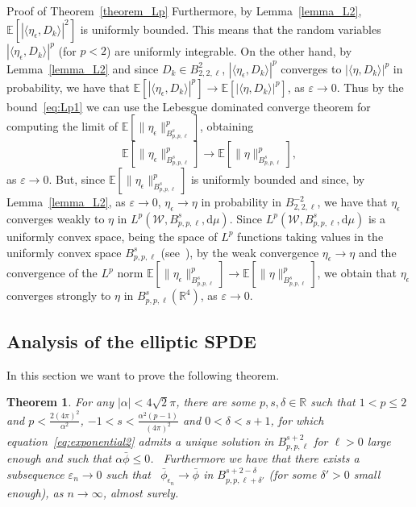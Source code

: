 \documentclass[a4paper,10pt]{article}
\newcommand{\mathd}{\mathrm{d}}
\newenvironment{proof*}[1]{\noindent\textbf{#1\ }}{\hspace*{\fill}$\Box$\medskip}
\newtheorem{theorem}{Theorem}
\begin{document}
\begin{proof*}{Proof of Theorem~\ref{theorem_Lp}}
  Furthermore, by Lemma~\ref{lemma_L2}, $\mathbb{E} [| \langle
  \eta_{\epsilon}, D_k \rangle |^2]$ is uniformly bounded. This means that the
  random variables $| \langle \eta_{\epsilon}, D_k \rangle |^p$ (for $p < 2$)
  are uniformly integrable. On the other hand, by Lemma~\ref{lemma_L2} and
  since $D_k \in B^2_{2, 2, \ell}$, $| \langle \eta_{\epsilon}, D_k \rangle
  |^p$ converges to $| \langle \eta, D_k \rangle |^p$ in probability, we have
  that $\mathbb{E} [| \langle \eta_{\epsilon}, D_k \rangle |^p] \rightarrow
  \mathbb{E} [| \langle \eta, D_k \rangle |^p]$, as $\varepsilon \rightarrow
  0$. Thus by the bound~{\eqref{eq:Lp1}} we can use the Lebesgue dominated
  converge theorem for computing the limit of $\mathbb{E} [\| \eta_{\epsilon}
  \|_{B^s_{p, p, \ell}}^p]$, obtaining
  \[ \mathbb{E} [\| \eta_{\epsilon} \|_{B^s_{p, p, \ell}}^p] \rightarrow
     \mathbb{E} [\| \eta \|_{B^s_{p, p, \ell}}^p], \]
  as $\varepsilon \rightarrow 0$. But, since $\mathbb{E} [\| \eta_{\epsilon}
  \|_{B^s_{p, p, \ell}}^p]$ is uniformly bounded and since, by
  Lemma~\ref{lemma_L2}, as $\varepsilon \rightarrow 0$, $\eta_{\epsilon}
  \rightarrow \eta$ in probability in $B^{- 2}_{2, 2, \ell}$, we have that
  $\eta_{\epsilon}$ converges weakly to $\eta$ in $L^p (\mathcal{W}, B^s_{p,
  p, \ell}, \mathd \mu)$. Since $L^p (\mathcal{W}, B^s_{p, p, \ell}, \mathd
  \mu)$ is a uniformly convex space, being the space of $L^p$ functions taking
  values in the uniformly convex space $B^s_{p, p, \ell}$
  (see~{\cite{Boyko2009}}), by the weak convergence $\eta_{\epsilon}
  \rightarrow \eta$ and the convergence of the $L^p$ norm $\mathbb{E} [\|
  \eta_{\epsilon} \|_{B^s_{p, p, \ell}}^p] \rightarrow \mathbb{E} [\| \eta
  \|_{B^s_{p, p, \ell}}^p]$, we obtain that $\eta_{\epsilon}$ converges
  strongly to $\eta$ in $B^s_{p, p, \ell} (\mathbb{R}^4)$, as $\varepsilon
  \rightarrow 0$. 
\end{proof*}

\subsection{Analysis of the elliptic SPDE}\label{subsection_analytic}

In this section we want to prove the following theorem.

\begin{theorem}
  \label{theorem_exponentialmain}For any $| \alpha | < 4 \sqrt{2} \pi$, there
  are some $p, s, \delta \in \mathbb{R}$ such that $1 < p \leqslant 2$ and $p
  < \frac{2 (4 \pi)^2}{\alpha^2}$, $- 1 < s < \frac{\alpha^2 (p - 1)}{(4
  \pi)^2}$ and $0 < \delta < s + 1$, for which
  equation~{\eqref{eq:exponential2}} admits a unique solution in $B^{s +
  2}_{p, p, \ell}$ for $\ell > 0$ large enough and such that $\alpha
  \bar{\phi} \leqslant 0$. \ Furthermore we have that there exists a
  subsequence $\varepsilon_n \rightarrow 0$ such that \
  $\bar{\phi}_{\epsilon_n} \rightarrow \bar{\phi}$ in $B^{s + 2 - \delta}_{p,
  p, \ell + \delta'}$ (for some $\delta' > 0$ small enough), as $n \rightarrow
  \infty$, almost surely.
\end{theorem}
\end{document}
